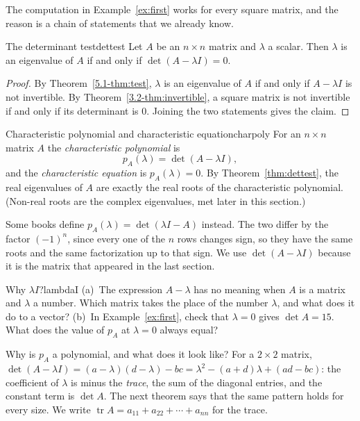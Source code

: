 \documentclass[11pt]{article}
\begin{document}
The computation in Example~\ref{ex:first} works for every square matrix, and the reason is a chain of statements that we already know.

\begin{thm}{The determinant test}{dettest}
Let $A$ be an $n\times n$ matrix and $\lambda$ a scalar. Then $\lambda$ is an eigenvalue of $A$ if and only if $\det(A-\lambda I)=0$.
\end{thm}

\begin{proof}
By Theorem~\ref{5.1-thm:test}, $\lambda$ is an eigenvalue of $A$ if and only if $A-\lambda I$ is not invertible. By Theorem~\ref{3.2-thm:invertible}, a square matrix is not invertible if and only if its determinant is $0$. Joining the two statements gives the claim.
\end{proof}

\begin{defn}{Characteristic polynomial and characteristic equation}{charpoly}
For an $n\times n$ matrix $A$ the \emph{characteristic polynomial} is
\[
p_A(\lambda)=\det(A-\lambda I),
\]
and the \emph{characteristic equation} is $p_A(\lambda)=0$. By Theorem~\ref{thm:dettest}, the real eigenvalues of $A$ are exactly the real roots of the characteristic polynomial. (Non-real roots are the complex eigenvalues, met later in this section.)
\end{defn}

Some books define $p_A(\lambda)=\det(\lambda I-A)$ instead. The two differ by the factor $(-1)^n$, since every one of the $n$ rows changes sign, so they have the same roots and the same factorization up to that sign. We use $\det(A-\lambda I)$ because it is the matrix that appeared in the last section.

\begin{think}{Why $\lambda I$?}{lambdaI}
(a)~The expression $A-\lambda$ has no meaning when $A$ is a matrix and $\lambda$ a number. Which matrix takes the place of the number $\lambda$, and what does it do to a vector? (b)~In Example~\ref{ex:first}, check that $\lambda=0$ gives $\det A=15$. What does the value of $p_A$ at $\lambda=0$ always equal?
\end{think}

Why is $p_A$ a polynomial, and what does it look like? For a $2\times2$ matrix, $\det(A-\lambda I)=(a-\lambda)(d-\lambda)-bc=\lambda^2-(a+d)\lambda+(ad-bc)$: the coefficient of $\lambda$ is minus the \emph{trace}, the sum of the diagonal entries, and the constant term is $\det A$. The next theorem says that the same pattern holds for every size. We write $\operatorname{tr}A=a_{11}+a_{22}+\cdots+a_{nn}$ for the trace.
\end{document}
